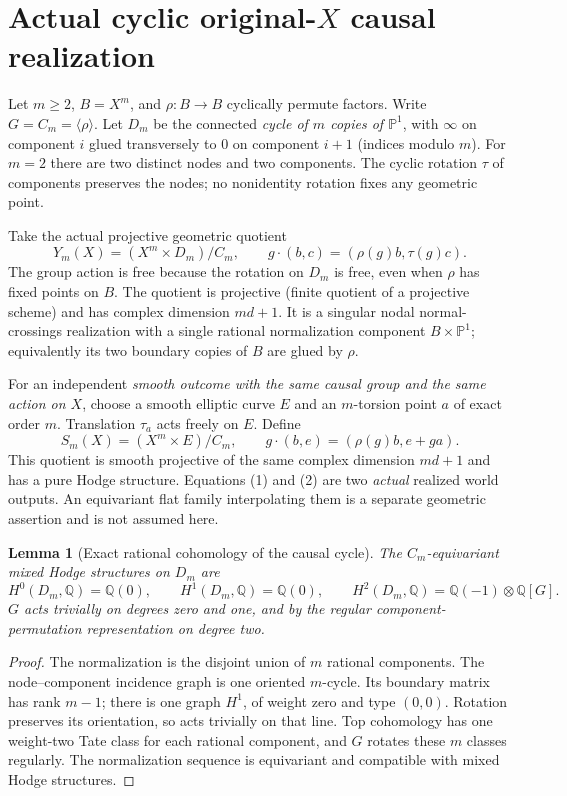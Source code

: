 \documentclass[11pt]{article}
\newtheorem{lemma}{Lemma}
\begin{document}
\section{Actual cyclic original-$X$ causal realization}
Let $m\geq2$, $B=X^m$, and $\rho:B\to B$ cyclically permute factors.
Write $G=C_m=\langle\rho\rangle$.
Let $D_m$ be the connected \emph{cycle of $m$ copies of
$\mathbb P^1$}, with $\infty$ on component $i$ glued transversely
to $0$ on component $i+1$ (indices modulo $m$).
For $m=2$ there are two distinct nodes and two components.
The cyclic rotation $\tau$ of components preserves the nodes;
no nonidentity rotation fixes any geometric point.

Take the actual projective geometric quotient
\[
       Y_m(X)=(X^m\times D_m)/C_m ,
       \qquad
       g\cdot(b,c)=(\rho(g)b,\tau(g)c).
       \tag{1}
\]
The group action is free because the rotation on $D_m$ is free,
even when $\rho$ has fixed points on $B$.
The quotient is projective (finite quotient of a projective scheme)
and has complex dimension $md+1$. It is a singular nodal
normal-crossings realization with a single rational normalization
component $B\times\mathbb P^1$; equivalently its two boundary
copies of $B$ are glued by $\rho$.

For an independent \emph{smooth outcome with the same causal
group and the same action on $X$}, choose a smooth elliptic curve
$E$ and an $m$-torsion point $a$ of exact order $m$.
Translation $\tau_a$ acts freely on $E$. Define
\[
       S_m(X)=(X^m\times E)/C_m ,
       \qquad
       g\cdot(b,e)=(\rho(g)b,e+g a).
       \tag{2}
\]
This quotient is smooth projective of the same complex dimension
$md+1$ and has a pure Hodge structure.
Equations (1) and (2) are two \emph{actual} realized world outputs.
An equivariant flat family interpolating them is a separate
geometric assertion and is not assumed here.

\begin{lemma}[Exact rational cohomology of the causal cycle]
The $C_m$-equivariant mixed Hodge structures on $D_m$ are
\[
 H^0(D_m,\mathbb Q)=\mathbb Q(0),\qquad
 H^1(D_m,\mathbb Q)=\mathbb Q(0),\qquad
 H^2(D_m,\mathbb Q)=\mathbb Q(-1)\otimes\mathbb Q[G].
 \tag{3}
\]
$G$ acts trivially on degrees zero and one, and by the regular
component-permutation representation on degree two.
\end{lemma}
\begin{proof}
The normalization is the disjoint union of $m$ rational
components. The node--component incidence graph is one
oriented $m$-cycle. Its boundary matrix has rank $m-1$;
there is one graph $H^1$, of weight zero and type $(0,0)$.
Rotation preserves its orientation, so acts trivially on that line.
Top cohomology has one weight-two Tate class for each rational
component, and $G$ rotates these $m$ classes regularly.
The normalization sequence is equivariant and compatible with
mixed Hodge structures.
\end{proof}
\end{document}

